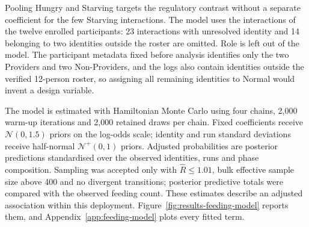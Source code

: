 Pooling Hungry and Starving targets the regulatory contrast without a separate coefficient for the few Starving interactions. The model uses the interactions of the twelve enrolled participants: 23 interactions with unresolved identity and 14 belonging to two identities outside the roster are omitted. Role is left out of the model. The participant metadata fixed before analysis identifies only the two Providers and two Non-Providers, and the logs also contain identities outside the verified 12-person roster, so assigning all remaining identities to Normal would invent a design variable.

The model is estimated with Hamiltonian Monte Carlo using four chains, 2,000 warm-up iterations and 2,000 retained draws per chain. Fixed coefficients receive $\mathcal{N}(0,1.5)$ priors on the log-odds scale; identity and run standard deviations receive half-normal $\mathcal{N}^{+}(0,1)$ priors. Adjusted probabilities are posterior predictions standardised over the observed identities, runs and phase composition. Sampling was accepted only with $\hat R\leq1.01$, bulk effective sample size above 400 and no divergent transitions; posterior predictive totals were compared with the observed feeding count. These estimates describe an adjusted association within this deployment. Figure~\ref{fig:results-feeding-model} reports them, and Appendix~\ref{app:feeding-model} plots every fitted term.

